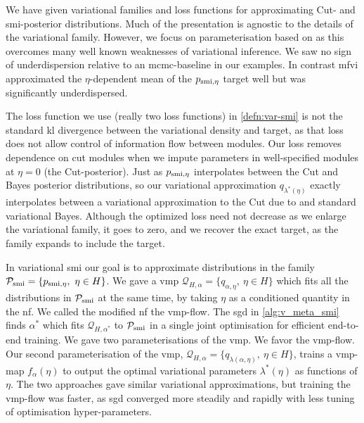 We have given variational families and loss functions for approximating Cut- and \acrshort*{smi}-posterior distributions. Much of the presentation is agnostic to the details of the variational family. However, we focus on parameterisation based on  as this overcomes many well known weaknesses of variational inference. We saw no sign of underdispersion relative to an \acrshort*{mcmc}-baseline in our examples. In contrast \acrshort*{mfvi} approximated the $\eta$-dependent mean of the $p_{\operatorname{\text{smi}},\eta}$ target well but was significantly underdispersed.

The loss function we use (really two loss functions) in \cref{defn:var-smi} is not the standard \acrshort*{kl} divergence between the variational density and target, as that loss does not allow control of information flow between modules. Our loss removes dependence on cut modules when we impute parameters in well-specified modules at $\eta=0$ (the Cut-posterior). Just as $p_{\operatorname{\text{smi}},\eta}$ interpolates between the Cut and Bayes posterior distributions, so our variational approximation $q_{\lambda^*(\eta)}$ exactly interpolates between a variational approximation to the Cut due to \cite{Yu2021variationalcut} and standard variational Bayes. Although the optimized loss need not decrease as we enlarge the variational family, it goes to zero, and we recover the exact target, as the family expands to include the target.

In variational \acrshort*{smi} our goal is to approximate distributions in the family $\mathcal{P}_{\operatorname{\text{smi}}}=\{p_{\operatorname{\text{smi}},\eta},\ \eta\in H\}$. We gave a \acrlong*{vmp} $\mathcal{Q}_{H,\alpha}=\{q_{\alpha,\eta},\ \eta\in H\}$ which fits all the distributions in $\mathcal{P}_{\operatorname{\text{smi}}}$ at the same time, by taking $\eta$ as a conditioned quantity in the \acrshort*{nf}. We called the modified \acrshort*{nf} the \acrshort*{vmp}-flow. The \acrshort*{sgd} in \cref{alg:v_meta_smi} finds $\alpha^*$ which fits $\mathcal{Q}_{H,\alpha^*}$ to $\mathcal{P}_{\operatorname{\text{smi}}}$ in a single joint optimisation for efficient end-to-end training. We gave two parameterisations of the \acrshort*{vmp}. We favor the \acrshort*{vmp}-flow. Our second parameterisation of the \acrshort*{vmp}, $\mathcal{Q}_{H,\alpha}=\{q_{\lambda(\alpha,\eta)},\ \eta\in H\}$, trains a \acrshort*{vmp}-map $f_{\alpha}(\eta)$ to output the optimal variational parameters $\lambda^*(\eta)$ as functions of $\eta$. The two approaches gave similar variational approximations, but training the \acrshort*{vmp}-flow was faster, as \acrshort*{sgd} converged more steadily and rapidly with less tuning of optimisation hyper-parameters.


